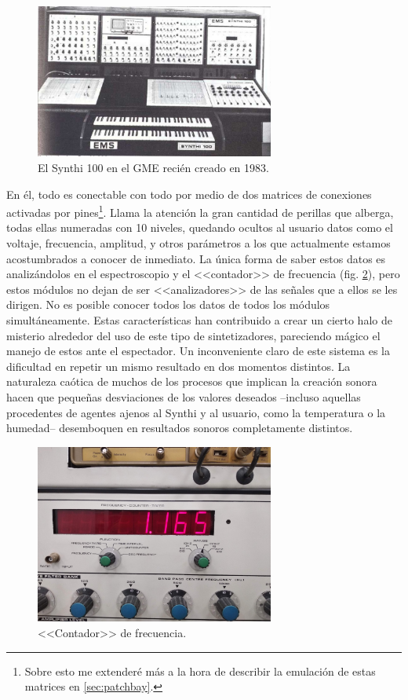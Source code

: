 \begin{figure}
	\centering
	\includegraphics[width=0.7\textwidth]{synthi_1984}
	\caption[El Synthi 100 en el GME recién creado en 1983.]{El Synthi 100 en el GME recién creado en 1983.}
	\label{fig:synthi_1984}
\end{figure}

En él, todo es conectable con todo por medio de dos matrices de conexiones activadas por pines\footnote{Sobre esto me extenderé más a la hora de describir la emulación de estas matrices en \ref{sec:patchbay}.}. Llama la atención la gran cantidad de perillas que alberga, todas ellas numeradas con 10 niveles, quedando ocultos al usuario datos como el voltaje, frecuencia, amplitud, y otros parámetros a los que actualmente estamos acostumbrados a conocer de inmediato. La única forma de saber estos datos es analizándolos en el espectroscopio y el <<contador>> de frecuencia (fig. \ref{fig:frequency_counter}), pero estos módulos no dejan de ser <<analizadores>> de las señales que a ellos se les dirigen. No es posible conocer todos los datos de todos los módulos simultáneamente. Estas características han contribuido a crear un cierto halo de misterio alrededor del uso de este tipo de sintetizadores, pareciendo mágico el manejo de estos ante el espectador. Un inconveniente claro de este sistema es la dificultad en repetir un mismo resultado en dos momentos distintos. La naturaleza caótica de muchos de los procesos que implican la creación sonora hacen que pequeñas desviaciones de los valores deseados --incluso aquellas procedentes de agentes ajenos al Synthi y al usuario, como la temperatura o la humedad-- desemboquen en resultados sonoros completamente distintos.

\begin{figure}
	\centering
	\includegraphics[width=0.7\textwidth]{frequency_counter}
	\caption[<<Contador>> de frecuencia.]{<<Contador>> de frecuencia.}
	\label{fig:frequency_counter}
\end{figure}


